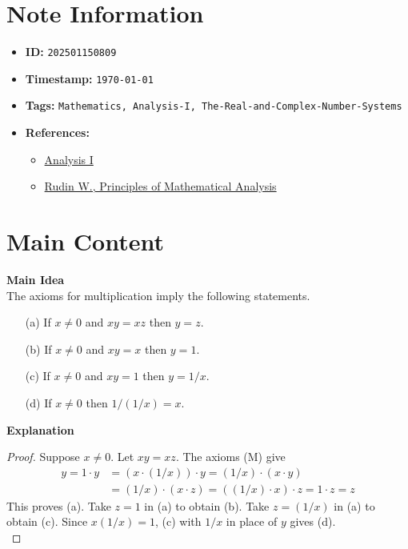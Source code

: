 \clearpage
{}
\label{202501150809}
\renewcommand{\notetitle}{Implications of the Multiplication Axioms}

\section*{Note Information}
\begin{itemize}
  \item \textbf{ID:} \texttt{202501150809}
  \item \textbf{Timestamp:} \texttt{\today \ \currenttime}
  \item \textbf{Tags:} \texttt{Mathematics, Analysis-I, The-Real-and-Complex-Number-Systems}
  \item \textbf{References:}
    \begin{itemize}
      \item \href{https://ocw.mit.edu/courses/18-100b-analysis-i-fall-2010/}{Analysis I}
      \item \href{/home/garrett/Personal/References/Mathematics/Analysis-I/Rudin.pdf}{Rudin W., Principles of Mathematical Analysis}
    \end{itemize}
\end{itemize}


\section*{Main Content}
\textbf{Main Idea}\\
The axioms for multiplication imply the following statements.
\begin{itemize}
  \item[(a)] If $x \neq 0$ and $xy = xz$ then $y = z$.
  \item[(b)] If $x \neq 0$ and $xy = x$ then $y = 1$.
  \item[(c)] If $x \neq 0$ and $xy = 1$ then $y = 1/x$.
  \item[(d)] If $x \neq 0$ then $1/(1/x) = x$.\\
\end{itemize}

\textbf{Explanation}\\
\begin{proof}
  Suppose $x \neq 0$. Let $xy = xz$. The axioms (M) give
  \begin{align*}
    y = 1 \cdot y &= (x \cdot (1/x)) \cdot y = (1/x) \cdot (x \cdot y)\\
                  &= (1/x) \cdot (x \cdot z) = ((1/x) \cdot x) \cdot z = 1 \cdot z = z
  \end{align*}
  This proves (a). Take $z = 1$ in (a) to obtain (b). Take $z = (1/x)$ in (a) to obtain (c). Since $x(1/x) = 1$, (c) with $1/x$ in place of $y$ gives (d).\\
\end{proof}


